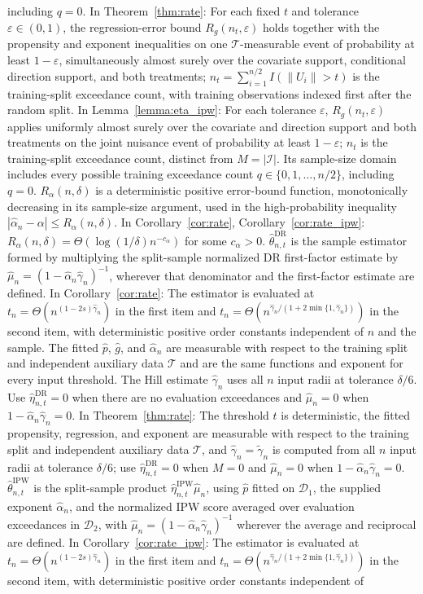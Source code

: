 \documentclass[12pt]{article}
\theoremstyle{plain}
\theoremstyle{definition}
\begin{document}
including $q=0$. In Theorem~\ref{thm:rate}: For each fixed $t$ and tolerance $\varepsilon\in(0,1)$, the regression-error bound $R_g(n_t,\varepsilon)$ holds together with the propensity and exponent inequalities on one $\mathcal T$-measurable event of probability at least $1-\varepsilon$, simultaneously almost surely over the covariate support, conditional direction support, and both treatments; $n_t=\sum_{i=1}^{n/2}I(\|U_i\|>t)$ is the training-split exceedance count, with training observations indexed first after the random split. In Lemma~\ref{lemma:eta_ipw}: For each tolerance $\varepsilon$, $R_g(n_t,\varepsilon)$ applies uniformly almost surely over the covariate and direction support and both treatments on the joint nuisance event of probability at least $1-\varepsilon$; $n_t$ is the training-split exceedance count, distinct from $M=|\mathcal I|$. Its sample-size domain includes every possible training exceedance count $q\in\{0,1,\ldots,n/2\}$, including $q=0$. $R_\alpha(n,\delta)$ is a deterministic positive error-bound function, monotonically decreasing in its sample-size argument, used in the high-probability inequality $|\hat\alpha_n-\alpha|\leqslant R_\alpha(n,\delta)$. In Corollary~\ref{cor:rate}, Corollary~\ref{cor:rate_ipw}: $R_\alpha(n,\delta)=\Theta(\log(1/\delta)n^{-c_\alpha})$ for some $c_\alpha>0$. $\widehat\theta_{n,t}^{\text{DR}}$ is the sample estimator formed by multiplying the split-sample normalized DR first-factor estimate by $\hat\mu_n=(1-\hat\alpha_n\hat\gamma_n)^{-1}$, wherever that denominator and the first-factor estimate are defined. In Corollary~\ref{cor:rate}: The estimator is evaluated at $t_n=\Theta(n^{(1-2s)\hat\gamma_n})$ in the first item and $t_n=\Theta(n^{\hat\gamma_n/(1+2\min\{1,\hat\gamma_n\})})$ in the second item, with deterministic positive order constants independent of $n$ and the sample. The fitted $\hat p$, $\hat g$, and $\hat\alpha_n$ are measurable with respect to the training split and independent auxiliary data $\mathcal T$ and are the same functions and exponent for every input threshold. The Hill estimate $\hat\gamma_n$ uses all $n$ input radii at tolerance $\delta/6$. Use $\hat\eta_{n,t}^{\mathrm{DR}}=0$ when there are no evaluation exceedances and $\hat\mu_n=0$ when $1-\hat\alpha_n\hat\gamma_n=0$. In Theorem~\ref{thm:rate}: The threshold $t$ is deterministic, the fitted propensity, regression, and exponent are measurable with respect to the training split and independent auxiliary data $\mathcal T$, and $\hat\gamma_n=\widetilde\gamma_n$ is computed from all $n$ input radii at tolerance $\delta/6$; use $\hat\eta_{n,t}^{\mathrm{DR}}=0$ when $M=0$ and $\hat\mu_n=0$ when $1-\hat\alpha_n\hat\gamma_n=0$. $\widehat\theta_{n,t}^{\text{IPW}}$ is the split-sample product $\hat\eta_{n,t}^{\mathrm{IPW}}\hat\mu_n$, using $\hat p$ fitted on $\mathcal D_1$, the supplied exponent $\hat\alpha_n$, and the normalized IPW score averaged over evaluation exceedances in $\mathcal D_2$, with $\hat\mu_n=(1-\hat\alpha_n\hat\gamma_n)^{-1}$ wherever the average and reciprocal are defined. In Corollary~\ref{cor:rate_ipw}: The estimator is evaluated at $t_n=\Theta(n^{(1-2s)\hat\gamma_n})$ in the first item and $t_n=\Theta(n^{\hat\gamma_n/(1+2\min\{1,\hat\gamma_n\})})$ in the second item, with deterministic positive order constants independent of 
\end{document}
